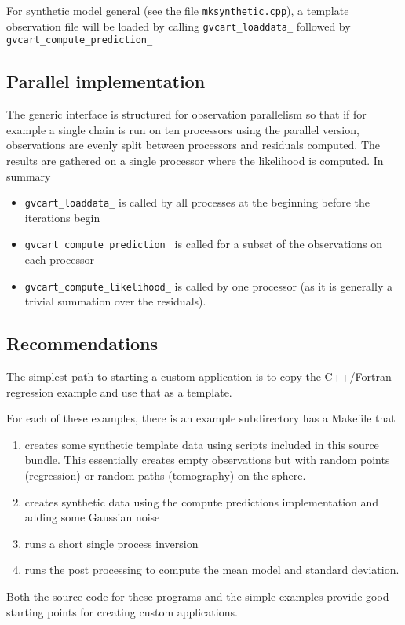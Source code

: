 \documentclass[a4paper,12pt]{article}
\begin{document}
For synthetic model general (see the file {\tt mksynthetic.cpp}), a
template observation file will be loaded by calling {\tt gvcart\_loaddata\_}
followed by {\tt gvcart\_compute\_prediction\_} 

\subsection{Parallel implementation}

The generic interface is structured for observation parallelism so that if for example
a single chain is run on ten processors using the parallel version, observations are
evenly split between processors and residuals computed. The results are gathered on
a single processor where the likelihood is computed. In summary

\begin{itemize}
\item {\tt gvcart\_loaddata\_} is called by all processes at the beginning before
  the iterations begin
\item {\tt gvcart\_compute\_prediction\_} is called for a subset of the observations
  on each processor
\item {\tt gvcart\_compute\_likelihood\_} is called by one processor (as it is
  generally a trivial summation over the residuals).
\end{itemize}

\subsection{Recommendations}

The simplest path to starting a custom application is to copy 
the C++/Fortran regression example and use that as
a template.

For each of these examples, there is an example subdirectory
has a Makefile that

\begin{enumerate}
\item creates some synthetic template data using scripts included in this source
  bundle. This essentially creates empty observations but with random points (regression) or
  random paths (tomography) on the sphere.
\item creates synthetic data using the compute predictions implementation and adding
  some Gaussian noise
\item runs a short single process inversion
\item runs the post processing to compute the mean model and standard deviation.
\end{enumerate}

Both the source code for these programs and the simple examples provide good
starting points for creating custom applications.




\end{document}
